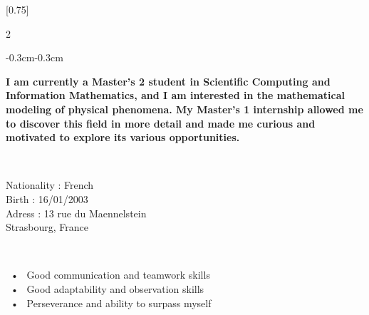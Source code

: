 \documentclass[lighthipster]{latex_for_CV/simplehipstercv}
\begin{document}
\setlength{\columnsep}{1.5cm}
[0.75]
\begin{paracol}{2}

\paracolbackgroundoptions



\footnotesize
{\setasidefontcolour
\begin{center}
\end{center}

\vspace{-0.8cm}
\begin{adjustwidth}{-0.3cm}{-0.3cm}
\begin{flushright}
{\textbf{\color{gray!130} I am currently a Master's 2 student in Scientific Computing and Information Mathematics, and I am interested in the mathematical modeling of physical phenomena. My Master's 1 internship allowed me to discover this field in more detail and made me curious and motivated to explore its various opportunities.}}
\end{flushright}
\end{adjustwidth}

\bigskip

\flushright
{} \\[0.5em]
\vspace{0.5em}

Nationality : French  \\
Birth : 16/01/2003 \\
Adress : 13 rue du Maennelstein \\ Strasbourg, France


\bigskip
\bigskip
\bigskip


 \\[0.5em]
\vspace{0.5em}

~•~ Good communication and teamwork skills \\
~•~ Good adaptability and observation skills \\
~•~ Perseverance and ability to surpass myself

\bigskip
\bigskip
\bigskip


\\[0.5em]
\vspace{0.5em}

}
\end{paracol}
\end{document}
